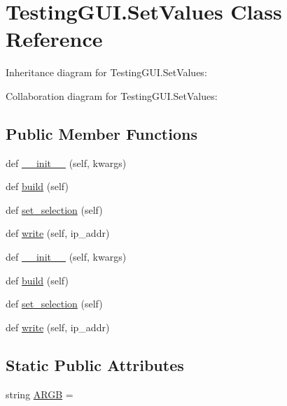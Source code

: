 \hypertarget{classTestingGUI_1_1SetValues}{}\section{Testing\+G\+U\+I.\+Set\+Values Class Reference}
\label{classTestingGUI_1_1SetValues}


Inheritance diagram for Testing\+G\+U\+I.\+Set\+Values\+:


Collaboration diagram for Testing\+G\+U\+I.\+Set\+Values\+:
\subsection*{Public Member Functions}
\begin{DoxyCompactItemize}
\item 
def \hyperlink{classTestingGUI_1_1SetValues_a2e5f962d54f1363a133feec2ca79a6f0}{\+\_\+\+\_\+init\+\_\+\+\_\+} (self, kwargs)
\item 
def \hyperlink{classTestingGUI_1_1SetValues_a27a7794b18e735441d0f90568b9b9070}{build} (self)
\item 
def \hyperlink{classTestingGUI_1_1SetValues_a1ac1751244272aadccd6d300ba58f70a}{set\+\_\+selection} (self)
\item 
def \hyperlink{classTestingGUI_1_1SetValues_abf5d39c7e49932e4d2fd545fecc97300}{write} (self, ip\+\_\+addr)
\item 
def \hyperlink{classTestingGUI_1_1SetValues_a2e5f962d54f1363a133feec2ca79a6f0}{\+\_\+\+\_\+init\+\_\+\+\_\+} (self, kwargs)
\item 
def \hyperlink{classTestingGUI_1_1SetValues_a27a7794b18e735441d0f90568b9b9070}{build} (self)
\item 
def \hyperlink{classTestingGUI_1_1SetValues_a1ac1751244272aadccd6d300ba58f70a}{set\+\_\+selection} (self)
\item 
def \hyperlink{classTestingGUI_1_1SetValues_abf5d39c7e49932e4d2fd545fecc97300}{write} (self, ip\+\_\+addr)
\end{DoxyCompactItemize}
\subsection*{Static Public Attributes}
\begin{DoxyCompactItemize}
\item 
string \hyperlink{classTestingGUI_1_1SetValues_a203442ab808fd942b5e86a3b8ec2fc15}{A\+R\+GB} = \textquotesingle{}\textquotesingle{}
\end{DoxyCompactItemize}



